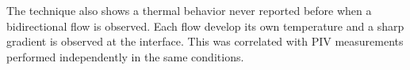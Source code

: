 \documentclass[]{spie}  %
\begin{document}
The technique also shows a thermal behavior never reported before when a bidirectional flow is observed. Each flow develop its own temperature and a sharp gradient is observed at the interface. This was correlated with PIV measurements performed independently in the same conditions.


\end{document}
